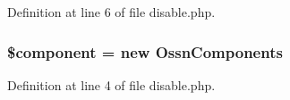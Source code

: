 Definition at line 6 of file disable.\+php.

\subsubsection[{\texorpdfstring{\$component}{$component}}]{\setlength{\rightskip}{0pt plus 5cm}\$component = new {\bf Ossn\+Components}}\hypertarget{disable_8php_a211527c21ba56109545060b49b628e59}{}\label{disable_8php_a211527c21ba56109545060b49b628e59}


Definition at line 4 of file disable.\+php.

